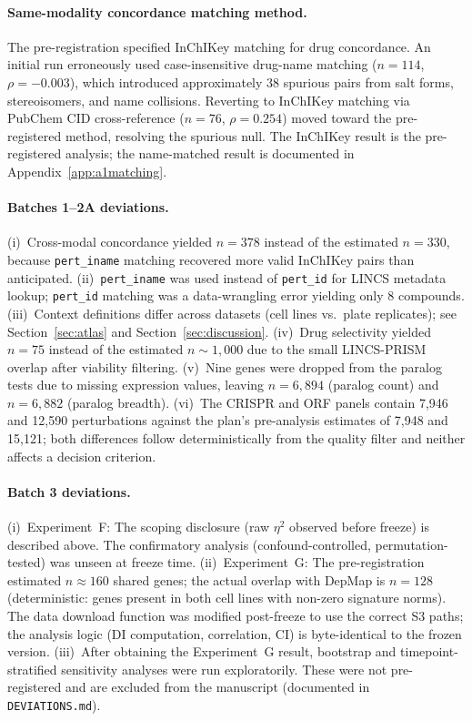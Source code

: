 \documentclass[11pt]{article}
\begin{document}
\paragraph{Same-modality concordance matching method.}
The pre-registration specified InChIKey matching for drug concordance.
An initial run erroneously used case-insensitive drug-name matching
($n = 114$, $\rho = -0.003$), which introduced approximately 38
spurious pairs from salt forms, stereoisomers, and name collisions.
Reverting to InChIKey matching via PubChem CID cross-reference
($n = 76$, $\rho = 0.254$) moved toward the pre-registered method,
resolving the spurious null.  The InChIKey result is the pre-registered analysis; the
name-matched result is documented in Appendix~\ref{app:a1matching}.

\paragraph{Batches 1--2A deviations.}
(i)~Cross-modal concordance yielded $n = 378$ instead of the estimated $n = 330$, because
\texttt{pert\_iname} matching recovered more valid InChIKey pairs than
anticipated.
(ii)~\texttt{pert\_iname} was used instead of \texttt{pert\_id} for
LINCS metadata lookup; \texttt{pert\_id} matching was a data-wrangling
error yielding only 8 compounds.
(iii)~Context definitions differ across datasets (cell lines vs.\ plate
replicates); see Section~\ref{sec:atlas} and Section~\ref{sec:discussion}.
(iv)~Drug selectivity yielded $n = 75$ instead of the estimated $n \sim 1{,}000$ due
to the small LINCS-PRISM overlap after viability filtering.
(v)~Nine genes were dropped from the paralog tests due to missing
expression values, leaving $n = 6{,}894$ (paralog count) and
$n = 6{,}882$ (paralog breadth).
(vi)~The CRISPR and ORF panels contain 7{,}946 and 12{,}590 perturbations
against the plan's pre-analysis estimates of 7{,}948 and 15{,}121; both
differences follow deterministically from the quality filter and neither
affects a decision criterion.

\paragraph{Batch 3 deviations.}
(i)~Experiment~F: The scoping disclosure (raw $\eta^2$ observed before
freeze) is described above.  The confirmatory analysis
(confound-controlled, permutation-tested) was unseen at freeze time.
(ii)~Experiment~G: The pre-registration estimated $n \approx 160$ shared
genes; the actual overlap with DepMap is $n = 128$ (deterministic:
genes present in both cell lines with non-zero signature norms).
The data download function was modified post-freeze to use the correct
S3 paths; the analysis logic (DI computation, correlation, CI) is
byte-identical to the frozen version.
(iii)~After obtaining the Experiment~G result, bootstrap and
timepoint-stratified sensitivity analyses were run exploratorily.
These were not pre-registered and are excluded from the manuscript
(documented in \texttt{DEVIATIONS.md}).
\end{document}
